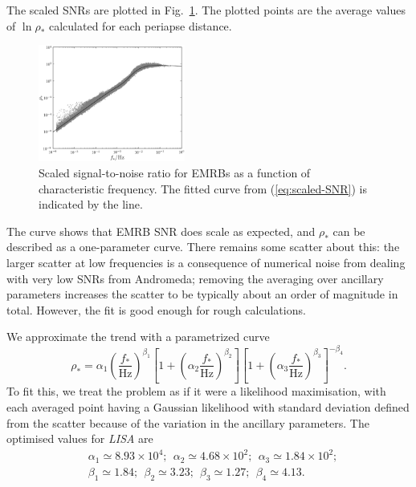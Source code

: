 \documentclass[useAMS,usedcolumn,usegraphicx,usenatbib]{mn2e}
\newcommand{\eqnref}[1]{(\ref{eq:#1})}
\newcommand{\figref}[1]{Fig.~\ref{fig:#1}}
\begin{document}
The scaled SNRs are plotted in \figref{scaled-SNR}. The plotted points are the average values of $\ln \rho_\ast$ calculated for each periapse distance.
\begin{figure}
\begin{center}
 \includegraphics[width=0.43\textwidth]{Fig_SNR_scaled_fit_small}
 \caption{Scaled signal-to-noise ratio for EMRBs as a function of characteristic frequency. The fitted curve from \eqnref{scaled-SNR} is indicated by the line.\label{fig:scaled-SNR}}
   \end{center}
\end{figure}
The curve shows that EMRB SNR does scale as expected, and $\rho_\ast$ can be described as a one-parameter curve. There remains some scatter about this: the larger scatter at low frequencies is a consequence of numerical noise from dealing with very low SNRs from Andromeda; removing the averaging over ancillary parameters increases the scatter to be typically about an order of magnitude in total. However, the fit is good enough for rough calculations.

We approximate the trend with a parametrized curve
\begin{equation}
\rho_\ast = \alpha_1 \left(\frac{f_\ast}{\mathrm{Hz}}\right)^{\beta_1} \left[1 + \left(\alpha_2 \frac{f_\ast}{\mathrm{Hz}}\right)^{\beta_2}\right]\left[1 + \left(\alpha_3 \frac{f_\ast}{\mathrm{Hz}}\right)^{\beta_3}\right]^{-\beta_4}.
\label{eq:scaled-SNR}
\end{equation}
To fit this, we treat the problem as if it were a likelihood maximisation, with each averaged point having a Gaussian likelihood with standard deviation defined from the scatter because of the variation in the ancillary parameters. The optimised values for \textit{LISA} are
\begin{equation}
\begin{split}
&\alpha_1 \simeq 8.93 \times 10^4; \ \ \alpha_2 \simeq 4.68 \times 10^2; \ \  \alpha_3 \simeq 1.84 \times 10^2;\\
&\beta_1 \simeq 1.84; \ \ \beta_2 \simeq 3.23; \ \ \beta_3 \simeq 1.27; \ \ \beta_4 \simeq 4.13.
\end{split}
\end{equation}
\end{document}

